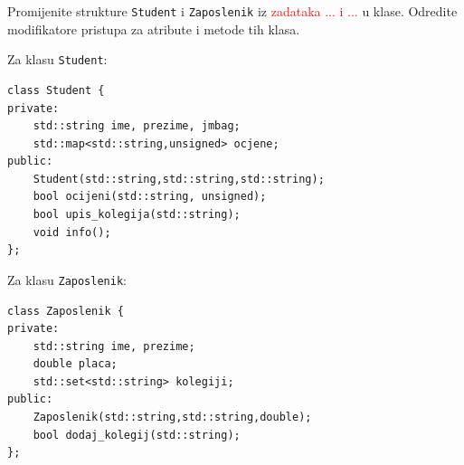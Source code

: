 \begin{zadatak}\label{zad:klase-student-zaposlenik}
    Promijenite strukture \texttt{Student} i \texttt{Zaposlenik}
    iz \textcolor{red}{zadataka ... i ...}
    u klase.
    Odredite modifikatore pristupa za atribute i metode tih klasa.
\end{zadatak}


\begin{rjesenje}
Za klasu \texttt{Student}:
\begin{verbatim}
class Student {
private:
    std::string ime, prezime, jmbag;
    std::map<std::string,unsigned> ocjene;
public:
    Student(std::string,std::string,std::string);
    bool ocijeni(std::string, unsigned);
    bool upis_kolegija(std::string);
    void info();
};
\end{verbatim}

Za klasu \texttt{Zaposlenik}:
\begin{verbatim}
class Zaposlenik {
private:
    std::string ime, prezime;
    double placa;
    std::set<std::string> kolegiji;
public:
    Zaposlenik(std::string,std::string,double);
    bool dodaj_kolegij(std::string);
};
\end{verbatim}
\end{rjesenje}

